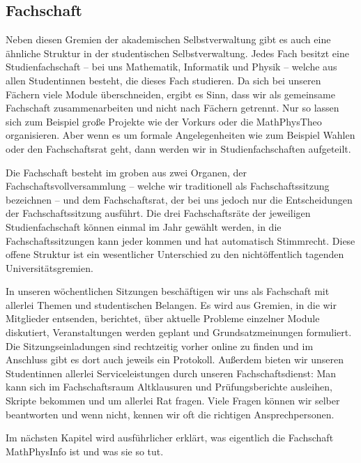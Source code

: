 \subsection{Fachschaft}
Neben diesen Gremien der akademischen Selbstverwaltung gibt es auch eine ähnliche Struktur in der studentischen Selbstverwaltung. Jedes Fach besitzt eine Studienfachschaft -- bei uns Mathematik, Informatik und Physik -- welche aus allen Studentinnen besteht, die dieses Fach studieren. Da sich bei unseren Fächern viele Module überschneiden, ergibt es Sinn, dass wir als gemeinsame Fachschaft zusammenarbeiten und nicht nach Fächern getrennt. Nur so lassen sich zum Beispiel große Projekte wie der Vorkurs oder die MathPhysTheo organisieren. Aber wenn es um formale Angelegenheiten wie zum Beispiel Wahlen oder den Fachschaftsrat geht, dann werden wir in Studienfachschaften aufgeteilt.

Die Fachschaft besteht im groben aus zwei Organen, der Fachschaftsvollversammlung -- welche wir traditionell als Fachschaftssitzung bezeichnen -- und dem Fachschaftsrat, der bei uns jedoch nur die Entscheidungen der Fachschaftssitzung ausführt. Die drei Fachschaftsräte der jeweiligen Studienfachschaft können einmal im Jahr gewählt werden, in die Fachschaftssitzungen kann jeder kommen und hat automatisch Stimmrecht. Diese offene Struktur ist ein wesentlicher Unterschied zu den nichtöffentlich tagenden Universitätsgremien.

In unseren wöchentlichen Sitzungen beschäftigen wir uns als Fachschaft mit allerlei Themen und studentischen Belangen.
Es wird aus Gremien, in die wir Mitglieder entsenden, berichtet, über aktuelle Probleme einzelner Module diskutiert, Veranstaltungen werden geplant und Grundsatzmeinungen formuliert. Die Sitzungseinladungen sind rechtzeitig vorher online zu finden und im Anschluss gibt es dort auch jeweils ein Protokoll. Außerdem bieten wir unseren Studentinnen allerlei Serviceleistungen durch unseren Fachschaftsdienst: Man kann sich im Fachschaftsraum Altklausuren und Prüfungsberichte ausleihen, Skripte bekommen und um allerlei Rat fragen. Viele Fragen können wir selber beantworten und wenn nicht, kennen wir oft die richtigen Ansprechpersonen.

Im nächsten Kapitel wird ausführlicher erklärt, was eigentlich die Fachschaft MathPhysInfo ist und was sie so tut.

\begin{figure*}[b]
    \centering
\end{figure*}

